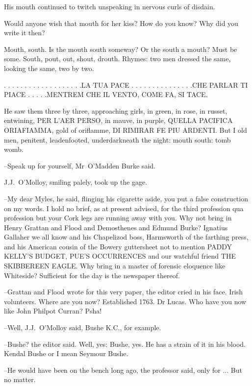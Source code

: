 His mouth continued to twitch unspeaking
in nervous curls of disdain.

Would anyone wish that mouth for her kiss?
How do you know?
Why did you write it then?



Mouth, south.
Is the mouth south someway?
Or the south a mouth?
Must be some.
South,
pout,
out,
shout,
drouth.
Rhymes:
two men dressed the same,
looking the same,
two by two.


    . . . . . . . . . . . . . . . . . . .LA TUA PACE
    . . . . . . . . . . . . . . .CHE PARLAR TI PIACE
    . . . . .MENTREM CHE IL VENTO, COME FA, SI TACE.


He saw them three by three,
approaching girls,
in green,
in rose,
in russet,
entwining,
PER L'AER PERSO,
in mauve,
in purple,
QUELLA PACIFICA ORIAFIAMMA,
gold of oriflamme,
DI RIMIRAR FE PIU ARDENTI.
But I old men,
penitent,
leadenfooted,
underdarkneath the night:
mouth south:
tomb womb.

--Speak up for yourself,
Mr~O'Madden Burke said.



J.J.~O'Molloy,
smiling palely,
took up the gage.

--My dear Myles,
he said,
flinging his cigarette aside,
you put a false construction on my words.
I hold no brief,
as at present advised,
for the third profession qua profession
but your Cork legs are running away with you.
Why not bring in Henry Grattan and Flood and Demosthenes and Edmund Burke?
Ignatius Gallaher we all know
and his Chapelizod boss, Harmsworth of the farthing press,
and his American cousin of the Bowery guttersheet
not to mention PADDY KELLY'S BUDGET,
PUE'S OCCURRENCES
and our watchful friend THE SKIBBEREEN EAGLE.
Why bring in a master of forensic eloquence like Whiteside?
Sufficient for the day is the newspaper thereof.



--Grattan and Flood wrote for this very paper,
the editor cried in his face.
Irish volunteers.
Where are you now?
Established 1763.
Dr Lucas.
Who have you now like John Philpot Curran?
Psha!

--Well,
J.J.~O'Molloy said,
Bushe K.C., for example.

--Bushe?
the editor said.
Well, yes:
Bushe, yes.
He has a strain of it in his blood.
Kendal Bushe or I mean Seymour Bushe.

--He would have been on the bench long ago,
the professor said,
only for ...
But no matter.


